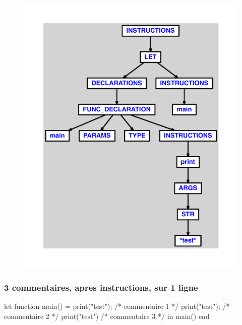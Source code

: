 \documentclass{article}
\begin{document}
\begin{figure}[H]\centering\includegraphics[max width=\textwidth]{ast/ast_159.pdf}\end{figure}\subsubsection{3 commentaires, apres instructions, sur 1 ligne}
\begin{verbatimtab}
let
	function main() =
		print("test");
		/* commentaire 1 */
		print("test");
		/* commentaire 2 */
		print("test")
		/* commentaire 3 */
in main() end
\end{verbatimtab}
\end{document}
